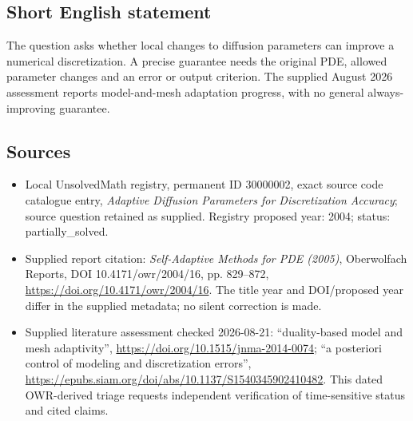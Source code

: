 \documentclass[11pt]{article}
\begin{document}
\subsection{Short English statement}
The question asks whether local changes to diffusion parameters can improve a numerical discretization. A precise guarantee needs the original PDE, allowed parameter changes and an error or output criterion. The supplied August 2026 assessment reports model-and-mesh adaptation progress, with no general always-improving guarantee.
\subsection{Sources}
\begin{itemize}
\item Local UnsolvedMath registry, permanent ID 30000002, exact source code catalogue entry, \emph{Adaptive Diffusion Parameters for Discretization Accuracy}; source question retained as supplied. Registry proposed year: 2004; status: partially\_solved.
\item Supplied report citation: \emph{Self-Adaptive Methods for PDE (2005)}, Oberwolfach Reports, DOI 10.4171/owr/2004/16, pp. 829--872, \url{https://doi.org/10.4171/owr/2004/16}. The title year and DOI/proposed year differ in the supplied metadata; no silent correction is made.
\item Supplied literature assessment checked 2026-08-21: ``duality-based model and mesh adaptivity'', \url{https://doi.org/10.1515/jnma-2014-0074}; ``a posteriori control of modeling and discretization errors'', \url{https://epubs.siam.org/doi/abs/10.1137/S1540345902410482}. This dated OWR-derived triage requests independent verification of time-sensitive status and cited claims.
\end{itemize}
\end{document}
